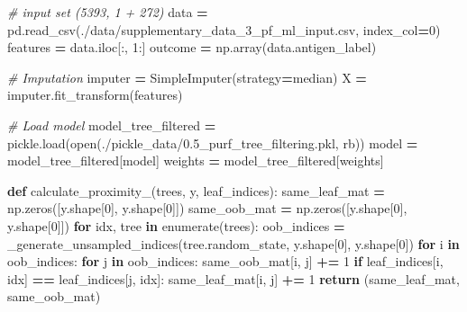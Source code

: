 \documentclass[
  11pt,
  oneside]{book}
\newenvironment{Shaded}{\begin{snugshade}}{\end{snugshade}}
\newcommand{\BuiltInTok}[1]{#1}
\newcommand{\CommentTok}[1]{\textcolor[rgb]{0.56,0.35,0.01}{\textit{#1}}}
\newcommand{\ControlFlowTok}[1]{\textcolor[rgb]{0.13,0.29,0.53}{\textbf{#1}}}
\newcommand{\DecValTok}[1]{\textcolor[rgb]{0.00,0.00,0.81}{#1}}
\newcommand{\KeywordTok}[1]{\textcolor[rgb]{0.13,0.29,0.53}{\textbf{#1}}}
\newcommand{\NormalTok}[1]{#1}
\newcommand{\OperatorTok}[1]{\textcolor[rgb]{0.81,0.36,0.00}{\textbf{#1}}}
\newcommand{\StringTok}[1]{\textcolor[rgb]{0.31,0.60,0.02}{#1}}
\begin{document}
\begin{Shaded}
\begin{Highlighting}[]
\CommentTok{\# input set (5393, 1 + 272)}
\NormalTok{data }\OperatorTok{=}\NormalTok{ pd.read\_csv(}\StringTok{\textquotesingle{}./data/supplementary\_data\_3\_pf\_ml\_input.csv\textquotesingle{}}\NormalTok{, index\_col}\OperatorTok{=}\DecValTok{0}\NormalTok{)}
\NormalTok{features }\OperatorTok{=}\NormalTok{ data.iloc[:, }\DecValTok{1}\NormalTok{:]}
\NormalTok{outcome }\OperatorTok{=}\NormalTok{ np.array(data.antigen\_label)}

\CommentTok{\# Imputation}
\NormalTok{imputer }\OperatorTok{=}\NormalTok{ SimpleImputer(strategy}\OperatorTok{=}\StringTok{\textquotesingle{}median\textquotesingle{}}\NormalTok{)}
\NormalTok{X }\OperatorTok{=}\NormalTok{ imputer.fit\_transform(features)}

\CommentTok{\# Load model}
\NormalTok{model\_tree\_filtered }\OperatorTok{=}\NormalTok{ pickle.load(}\BuiltInTok{open}\NormalTok{(}\StringTok{\textquotesingle{}./pickle\_data/0.5\_purf\_tree\_filtering.pkl\textquotesingle{}}\NormalTok{, }\StringTok{\textquotesingle{}rb\textquotesingle{}}\NormalTok{))}
\NormalTok{model }\OperatorTok{=}\NormalTok{ model\_tree\_filtered[}\StringTok{\textquotesingle{}model\textquotesingle{}}\NormalTok{]}
\NormalTok{weights }\OperatorTok{=}\NormalTok{ model\_tree\_filtered[}\StringTok{\textquotesingle{}weights\textquotesingle{}}\NormalTok{]}

\KeywordTok{def}\NormalTok{ calculate\_proximity\_(trees, y, leaf\_indices):}
\NormalTok{    same\_leaf\_mat }\OperatorTok{=}\NormalTok{ np.zeros([y.shape[}\DecValTok{0}\NormalTok{], y.shape[}\DecValTok{0}\NormalTok{]])}
\NormalTok{    same\_oob\_mat }\OperatorTok{=}\NormalTok{ np.zeros([y.shape[}\DecValTok{0}\NormalTok{], y.shape[}\DecValTok{0}\NormalTok{]])}
    \ControlFlowTok{for}\NormalTok{ idx, tree }\KeywordTok{in} \BuiltInTok{enumerate}\NormalTok{(trees):}
\NormalTok{        oob\_indices }\OperatorTok{=}\NormalTok{ \_generate\_unsampled\_indices(tree.random\_state, y.shape[}\DecValTok{0}\NormalTok{], y.shape[}\DecValTok{0}\NormalTok{])}
        \ControlFlowTok{for}\NormalTok{ i }\KeywordTok{in}\NormalTok{ oob\_indices:}
            \ControlFlowTok{for}\NormalTok{ j }\KeywordTok{in}\NormalTok{ oob\_indices:}
\NormalTok{                same\_oob\_mat[i, j] }\OperatorTok{+=} \DecValTok{1}
                \ControlFlowTok{if}\NormalTok{ leaf\_indices[i, idx] }\OperatorTok{==}\NormalTok{ leaf\_indices[j, idx]:}
\NormalTok{                    same\_leaf\_mat[i, j] }\OperatorTok{+=} \DecValTok{1}
    \ControlFlowTok{return}\NormalTok{ (same\_leaf\_mat, same\_oob\_mat)}


\end{Highlighting}
\end{Shaded}
\end{document}
